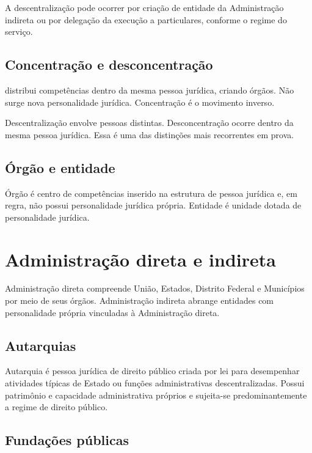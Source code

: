 A descentralização pode ocorrer por criação de entidade da Administração indireta ou por delegação da execução a particulares, conforme o regime do serviço.

\subsection{Concentração e desconcentração}

 distribui competências dentro da mesma pessoa jurídica, criando órgãos. Não surge nova personalidade jurídica. Concentração é o movimento inverso.

\begin{atencao}
Descentralização envolve pessoas distintas. Desconcentração ocorre dentro da mesma pessoa jurídica. Essa é uma das distinções mais recorrentes em prova.
\end{atencao}

\subsection{Órgão e entidade}

Órgão é centro de competências inserido na estrutura de pessoa jurídica e, em regra, não possui personalidade jurídica própria. Entidade é unidade dotada de personalidade jurídica.

\section{Administração direta e indireta}

Administração direta compreende União, Estados, Distrito Federal e Municípios por meio de seus órgãos. Administração indireta abrange entidades com personalidade própria vinculadas à Administração direta.

\subsection{Autarquias}

Autarquia é pessoa jurídica de direito público criada por lei para desempenhar atividades típicas de Estado ou funções administrativas descentralizadas. Possui patrimônio e capacidade administrativa próprios e sujeita-se predominantemente a regime de direito público.

\subsection{Fundações públicas}

